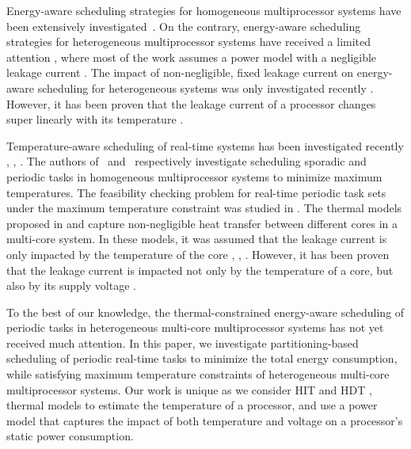 \documentclass[conference]{IEEEtran}
\begin{document}
Energy-aware %
scheduling strategies for homogeneous multiprocessor systems have been extensively investigated~\cite{Chen07}.  
On the contrary, energy-aware scheduling strategies for heterogeneous multiprocessor systems have
received a limited attention \cite{Chen09}, where most of the work assumes a power model with a negligible leakage %
current \cite{Schranzhofer10}.
The impact of non-negligible, fixed leakage current on energy-aware scheduling for heterogeneous systems was only investigated recently \cite{Chen09}.
However, it has been proven that the leakage current of a processor changes super linearly with its temperature \cite{Liu07}. %

Temperature-aware scheduling of real-time systems
has been investigated recently
\cite{Chantem10}, \cite{Quan10}, \cite{Fisher09}.
The authors of~\cite{Fisher09} and~\cite{Chantem10} respectively investigate scheduling sporadic and periodic tasks in 
homogeneous multiprocessor systems to minimize %
maximum temperatures. 
The feasibility
checking problem for real-time periodic task sets under the maximum
temperature constraint was studied in \cite{Quan10}. 
The thermal models proposed
in \cite{Chantem10} and \cite{Fisher09}  capture   non-negligible %
heat  transfer between different 
cores in a multi-core system. In these models, it was assumed that the leakage current is only impacted
by the temperature of the core \cite{Chantem10}, \cite{Fisher09}, \cite{Liu07}.
However, it has been %
proven that the leakage current is impacted not only by the temperature of a core, but also by its supply voltage \cite{Quan10}. 

To the best of our knowledge, the thermal-constrained energy-aware 
scheduling of periodic tasks in heterogeneous multi-core multiprocessor  systems has not yet received much attention. In this paper, we investigate partitioning-based scheduling %
of periodic real-time tasks to minimize the total energy consumption, while satisfying maximum temperature constraints of 
heterogeneous multi-core multiprocessor systems. 
Our work is unique as we consider HIT \cite{Quan10} and HDT \cite{Chantem10}, \cite{Fisher09} thermal models to estimate the temperature of a processor, and use a power model
that captures the impact of both temperature \cite{Fisher09} and voltage \cite{Quan10} on a processor's static power consumption.
\end{document}
